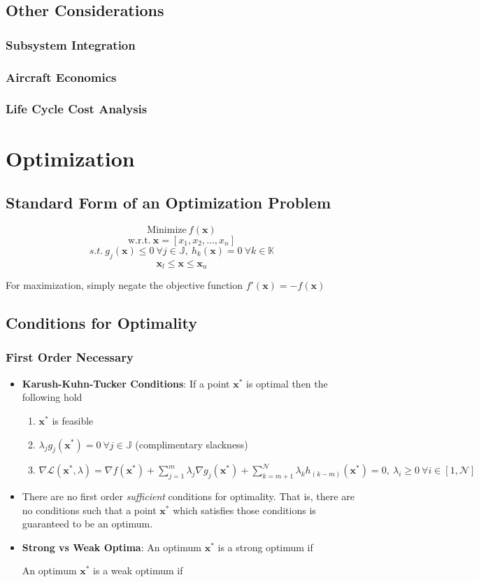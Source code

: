 \documentclass[12pt]{article}
\newcommand{\Item}[1]{\item \textbf{#1}:}
\newcommand{\CenteredBoxed}[1]{\begin{center}\boxed{#1}\end{center}}
\newcommand{\sumlim}[2]{\sum\limits_{#1}^{#2}}
\newcommand{\boldx}{\mathbf{x}}
\newcommand{\xstar}{\boldx^*}
\begin{document}
\subsection{Other Considerations}
\subsubsection{Subsystem Integration}
\subsubsection{Aircraft Economics}
\subsubsection{Life Cycle Cost Analysis}


\section{Optimization}
\subsection{Standard Form of an Optimization Problem}
$$\mathrm{Minimize}\ f(\boldx)$$
$$\mathrm{w.r.t.}\ \boldx=[x_1,x_2,\dots,x_n]$$
$$s.t.\ g_j(\boldx)\leq0\ \forall j\in\mathbb{J},\ h_k(\boldx)=0\ \forall k\in\mathbb{K}$$
$$\boldx_l\leq\boldx\leq\boldx_u$$

For maximization, simply negate the objective function $f'(\boldx)=-f(\boldx)$

\subsection{Conditions for Optimality}
\subsubsection{First Order Necessary}
\begin{itemize}
\Item{Karush-Kuhn-Tucker Conditions} If a point $\xstar$ is optimal then the following hold
	\begin{enumerate}
	\item $\xstar$ is feasible
	\item $\lambda_jg_j(\xstar)=0\ \forall j\in\mathbb{J}$ (complimentary slackness)
	\item $\nabla\mathcal{L}(\xstar,\lambda)=\nabla f(\xstar)+\sumlim{j=1}{m}\lambda_j\nabla g_j(\xstar)+\sumlim{k=m+1}{\mathcal{N}}\lambda_kh_{(k-m)}(\xstar)=0,\ \lambda_i\geq0\ \forall i\in[1,\mathcal{N}]$
	\end{enumerate}
\item There are no first order \emph{sufficient} conditions for optimality. That is, there are no conditions such that a point $\xstar$ which satisfies those conditions is guaranteed to be an optimum.
\Item{Strong vs Weak Optima} An optimum $\xstar$ is a strong optimum if
\CenteredBoxed{\xstar<\boldx\ \forall \boldx\in[\xstar-\varepsilon,\xstar+\varepsilon]}
An optimum $\xstar$ is a weak optimum if
\CenteredBoxed{\xstar\leq \boldx\ \forall \boldx\in[\xstar-\varepsilon,\xstar+\varepsilon]}
\end{itemize}
\end{document}
